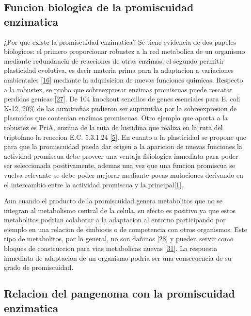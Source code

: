 \documentclass[12pt,twoside]{reedthesis}
\begin{document}
  \subsection{Funcion biologica de la promiscuidad
  enzimatica}\label{funcion-biologica-de-la-promiscuidad-enzimatica}
  
  ¿Por que existe la promiscuidad enzimatica? Se tiene evidencia de dos
  papeles biologicos: el primero proporcionar robustez a la red metabolica
  de un organismo mediante redundancia de reacciones de otras enzimas; el
  segundo permitir plasticidad evolutiva, es decir materia prima para la
  adaptacion a variaciones ambientales
  {[}\protect\hyperlink{ref-aharoni_evolvability_2005}{16}{]} mediante la
  adquisicion de nuevas funciones quimicas. Respecto a la robustez, se
  probo que sobreexpresar enzimas promiscuas puede rescatar perdidas
  genicas {[}\protect\hyperlink{ref-patrick_multicopy_2007}{27}{]}. De 104
  knockout sencillos de genes esenciales para E. coli K-12, 20\% de las
  auxotrofias pudieron ser suprimidas por la sobreexpresion de plasmidos
  que contenian enzimas promiscuas. Otro ejemplo que aporta a la robustez
  es PriA, enzima de la ruta de histidina que realiza en la ruta del
  triptofano la reaccion E.C. 5.3.1.24
  {[}\protect\hyperlink{ref-baronagomez_occurrence_2003}{5}{]}. En cuanto
  a la plasticidad se propone que para que la promiscuidad pueda dar
  origen a la aparicion de nuevas funciones la actividad promiscua debe
  proveer una ventaja fisiologica inmediata para poder ser seleccionada
  positivamente, ademas una vez que una funcion promiscua se vuelva
  relevante se debe poder mejorar mediante pocas mutaciones derivando en
  el intercambio entre la actividad promiscua y la
  principal{[}\protect\hyperlink{ref-khersonsky_enzyme_2010}{1}{]}.
  
  Aun cuando el producto de la promiscuidad genera metabolitos que no se
  integran al metabolismo central de la celula, su efecto es positivo ya
  que estos metabolitos podrian colaborar a la adaptacion al entorno
  participando por ejemplo en una relacion de simbiosis o de competencia
  con otros organismos. Este tipo de metabolitos, por lo general, no son
  dañinos {[}\protect\hyperlink{ref-notebaart_network-level_2014}{28}{]} y
  pueden servir como bloques de construccion para vias metabolicas nuevas
  {[}\protect\hyperlink{ref-ma_unconventional_2013}{31}{]}. La respuesta
  inmediata de adaptacion de un organismo podria ser una consecuencia de
  su grado de promiscuidad.
  
  \subsection{Relacion del pangenoma con la promiscuidad
  enzimatica}\label{relacion-del-pangenoma-con-la-promiscuidad-enzimatica}
  
\end{document}
